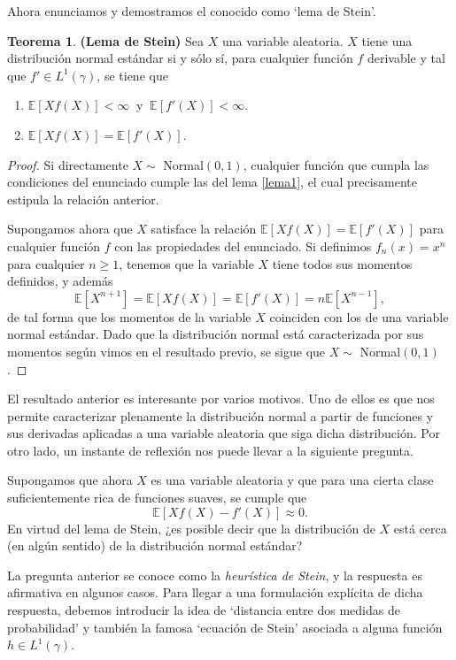 \documentclass[letterpaper,twoside,12pt]{book}
\newcommand{\E}{\mathbb{E}}
\newcommand{\1}{\mathds{1}}
\theoremstyle{definition}
\theoremstyle{definition}
\newtheorem{teo}{Teorema}
\theoremstyle{remark}
\theoremstyle{definition}
\theoremstyle{definition}
\theoremstyle{definition}
\theoremstyle{definition}
\theoremstyle{definition}
\begin{document}
Ahora enunciamos y demostramos el conocido como `lema de Stein'.
\begin{teo}\textbf{(Lema de Stein)} \label{LemaStein} Sea $X$ una variable aleatoria. $X$ tiene una distribución normal estándar si y sólo sí, para cualquier función $f$ derivable y tal que $f'\in L^{1}(\gamma)$, se tiene que
   \begin{enumerate}
       \item $\E\left[Xf(X)\right]<\infty \ $ y $ \ \E\left[f'(X)\right]<\infty$.
       \item $\E\left[Xf(X)\right]=\E\left[f'(X)\right]$.
   \end{enumerate}
\end{teo}
\begin{proof} 
  Si directamente $X\sim$ Normal$(0,1)$, cualquier función que cumpla las condiciones del enunciado cumple las del lema \ref{lema1}, el cual precisamente estipula la relación anterior. 

  Supongamos ahora que $X$ satisface la relación $\E\left[Xf(X)\right]=\E\left[f'(X)\right]$ para cualquier función $f$ con las propiedades del enunciado. Si definimos $f_n(x)=x^n$ para cualquier $n\geq1$, tenemos que la variable $X$ tiene todos sus momentos definidos, y además 
  \[
   \E\left[X^{n+1}\right]=\E\left[Xf(X)\right]=\E\left[f'(X)\right]=n\E\left[X^{n-1}\right],
  \] 
  de tal forma que los momentos de la variable $X$ coinciden con los de una variable normal estándar. Dado que la distribución normal está caracterizada por sus momentos según vimos en el resultado previo, se sigue que $X\sim$ Normal$(0,1)$.
 \end{proof}
El resultado anterior es interesante por varios motivos. Uno de ellos es que nos permite caracterizar plenamente la distribución normal a partir de funciones y sus derivadas aplicadas a una variable aleatoria que siga dicha distribución. Por otro lado, un instante de reflexión nos puede llevar a la siguiente pregunta.

Supongamos que ahora $X$ es una variable aleatoria y que para una cierta clase suficientemente rica de funciones suaves, se cumple que 
\[
\E\left[Xf(X)-f'(X)\right]\approx0.    
\]
En virtud del lema de Stein, ¿es posible decir que la distribución de $X$ está cerca (en algún sentido) de la distribución normal estándar?

La pregunta anterior se conoce como la \textit{heurística de Stein}, y la respuesta es afirmativa en algunos casos. Para llegar a una formulación explícita de dicha respuesta, debemos introducir la idea de `distancia entre dos medidas de probabilidad' y también la famosa `ecuación de Stein' asociada a alguna función $h\in L^1(\gamma)$. 
\end{document}
